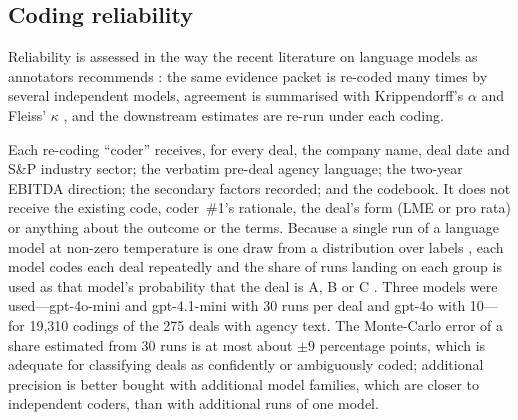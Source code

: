 \documentclass[12pt]{article}
\begin{document}
\subsection{Coding reliability}
\label{sec:reliability}

Reliability is assessed in the way the recent literature on language models as annotators recommends \citep{gilardi2023, tornberg2024, ziems2024}: the same evidence packet is re-coded many times by several independent models, agreement is summarised with Krippendorff's $\alpha$ \citep{krippendorff2018} and Fleiss' $\kappa$ \citep{landis1977}, and the downstream estimates are re-run under each coding.

Each re-coding ``coder'' receives, for every deal, the company name, deal date and S\&P industry sector; the verbatim pre-deal agency language; the two-year EBITDA direction; the secondary factors recorded; and the codebook. It does not receive the existing code, coder~\#1's rationale, the deal's form (LME or pro rata) or anything about the outcome or the terms. Because a single run of a language model at non-zero temperature is one draw from a distribution over labels \citep{reiss2023}, each model codes each deal repeatedly and the share of runs landing on each group is used as that model's probability that the deal is A, B or C \citep[``self-consistency'';][]{wang2023}. Three models were used---gpt-4o-mini and gpt-4.1-mini with 30 runs per deal and gpt-4o with 10---for 19,310 codings of the 275 deals with agency text. The Monte-Carlo error of a share estimated from 30 runs is at most about $\pm 9$ percentage points, which is adequate for classifying deals as confidently or ambiguously coded; additional precision is better bought with additional model families, which are closer to independent coders, than with additional runs of one model.
\end{document}
